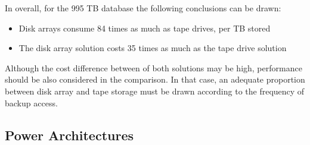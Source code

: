                 \begin{table}[h!tb]
                \centering 
                \label{tab:disk_array_power_costs} %
                \end{table}
                In overall, for the 995 TB database the following conclusions can be drawn:
                \begin{itemize}
	                \item Disk arrays consume 84 times as much as tape drives, per TB stored
	                \item The disk array solution costs 35 times as much as the tape drive solution
                \end{itemize}
                Although the cost difference between of both solutions may be high, performance should be also considered in the comparison. In that case, an adequate proportion between disk array and tape storage must be drawn according to the frequency of backup access.

        \subsection{Power Architectures} \label{sec2:power_architectures}
